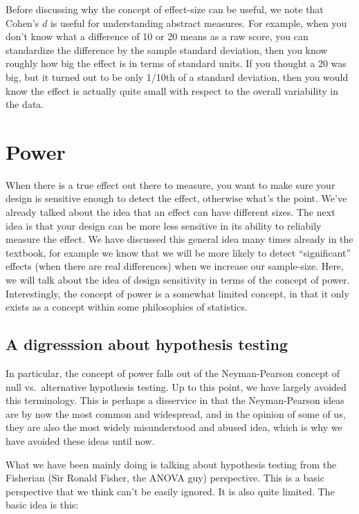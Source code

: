 \documentclass[]{book}
\begin{document}
Before discussing why the concept of effect-size can be useful, we note that Cohen's \(d\) is useful for understanding abstract measures. For example, when you don't know what a difference of 10 or 20 means as a raw score, you can standardize the difference by the sample standard deviation, then you know roughly how big the effect is in terms of standard units. If you thought a 20 was big, but it turned out to be only 1/10th of a standard deviation, then you would know the effect is actually quite small with respect to the overall variability in the data.

\hypertarget{power}{%
\section{Power}\label{power}}

When there is a true effect out there to measure, you want to make sure your design is sensitive enough to detect the effect, otherwise what's the point. We've already talked about the idea that an effect can have different sizes. The next idea is that your design can be more less sensitive in its ability to reliabily measure the effect. We have discussed this general idea many times already in the textbook, for example we know that we will be more likely to detect ``significant'' effects (when there are real differences) when we increase our sample-size. Here, we will talk about the idea of design sensitivity in terms of the concept of power. Interestingly, the concept of power is a somewhat limited concept, in that it only exists as a concept within some philosophies of statistics.

\hypertarget{a-digresssion-about-hypothesis-testing}{%
\subsection{A digresssion about hypothesis testing}\label{a-digresssion-about-hypothesis-testing}}

In particular, the concept of power falls out of the Neyman-Pearson concept of null vs.~alternative hypothesis testing. Up to this point, we have largely avoided this terminology. This is perhaps a disservice in that the Neyman-Pearson ideas are by now the most common and widespread, and in the opinion of some of us, they are also the most widely misunderstood and abused idea, which is why we have avoided these ideas until now.

What we have been mainly doing is talking about hypothesis testing from the Fisherian (Sir Ronald Fisher, the ANOVA guy) perspective. This is a basic perspective that we think can't be easily ignored. It is also quite limited. The basic idea is this:
\end{document}
